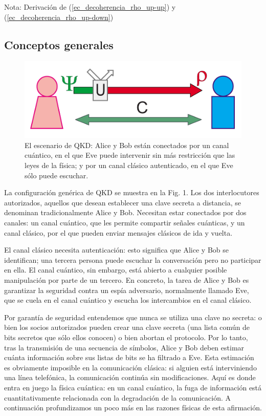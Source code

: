 \documentclass[a4paper,11pt]{book} %
\numberwithin{equation}{chapter}
\begin{document}
\begin{mybox_blue}{Nota: Derivación de (\ref{ec_decoherencia_rho_up-up}) y  (\ref{ec_decoherencia_rho_up-down})}
	
		\subsection{Conceptos generales}
		
	\begin{figure}[t]
	\centering 
	\includegraphics[width=0.5\linewidth]{Figuras/Fig_QKD_setup.png}
	\caption{El escenario de QKD: Alice y Bob están conectados por un canal cuántico, en el que Eve puede intervenir sin más restricción que las leyes de la física; y por un canal clásico autenticado, en el que Eve sólo puede escuchar.}
	\label{Fig_QKD_setup.png}
	\end{figure}
	
La configuración genérica de QKD se muestra en la Fig. 1. Los dos interlocutores autorizados, aquellos que desean establecer una clave secreta a distancia, se denominan tradicionalmente Alice y Bob. Necesitan estar conectados por dos canales: un canal cuántico, que les permite compartir señales cuánticas, y un canal clásico, por el que pueden enviar mensajes clásicos de ida y vuelta.

El canal clásico necesita autenticación: esto significa que Alice y Bob se identifican; una tercera persona puede escuchar la conversación pero no participar en ella. El canal cuántico, sin embargo, está abierto a cualquier posible manipulación por parte de un tercero. En concreto, la tarea de Alice y Bob es garantizar la seguridad contra un espía adversario, normalmente llamado Eve, que se cuela en el canal cuántico y escucha los intercambios en el canal clásico.

Por garantía de seguridad entendemos que nunca se utiliza una clave no secreta: o bien los socios autorizados pueden crear una clave secreta (una lista común de bits secretos que sólo ellos conocen) o bien abortan el protocolo. Por lo tanto, tras la transmisión de una secuencia de símbolos, Alice y Bob deben estimar cuánta información sobre sus listas de bits se ha filtrado a Eve. Esta estimación es obviamente imposible en la comunicación clásica: si alguien está interviniendo una línea telefónica, la comunicación continúa sin modificaciones. Aquí es donde entra en juego la física cuántica: en un canal cuántico, la fuga de información está cuantitativamente relacionada con la degradación de la comunicación. A continuación profundizamos un poco más en las razones físicas de esta afirmación.


\end{mybox_blue}
\end{document}
